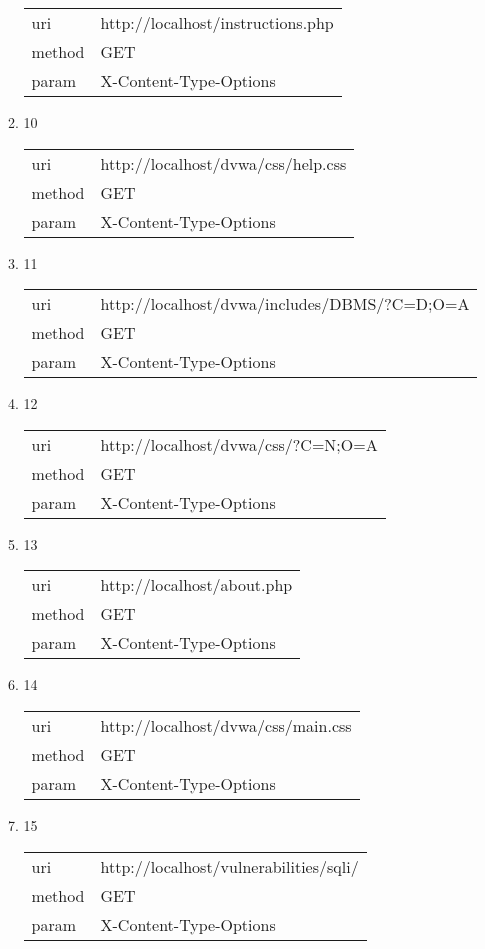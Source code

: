 \documentclass[10pt]{article}
\begin{document}
\begin{itemize}
\begin{enumerate}
\begin{tabular}{| l | p{14cm}}
uri & http://localhost/instructions.php \\
method & GET \\
param & X-Content-Type-Options \\
\end{tabular}
\item[] 10
\begin{tabular}{| l | p{14cm}}
uri & http://localhost/dvwa/css/help.css \\
method & GET \\
param & X-Content-Type-Options \\
\end{tabular}
\item[] 11
\begin{tabular}{| l | p{14cm}}
uri & http://localhost/dvwa/includes/DBMS/?C=D;O=A \\
method & GET \\
param & X-Content-Type-Options \\
\end{tabular}
\item[] 12
\begin{tabular}{| l | p{14cm}}
uri & http://localhost/dvwa/css/?C=N;O=A \\
method & GET \\
param & X-Content-Type-Options \\
\end{tabular}
\item[] 13
\begin{tabular}{| l | p{14cm}}
uri & http://localhost/about.php \\
method & GET \\
param & X-Content-Type-Options \\
\end{tabular}
\item[] 14
\begin{tabular}{| l | p{14cm}}
uri & http://localhost/dvwa/css/main.css \\
method & GET \\
param & X-Content-Type-Options \\
\end{tabular}
\item[] 15
\begin{tabular}{| l | p{14cm}}
uri & http://localhost/vulnerabilities/sqli/ \\
method & GET \\
param & X-Content-Type-Options \\
\end{tabular}

\end{enumerate}
\end{itemize}
\end{document}
